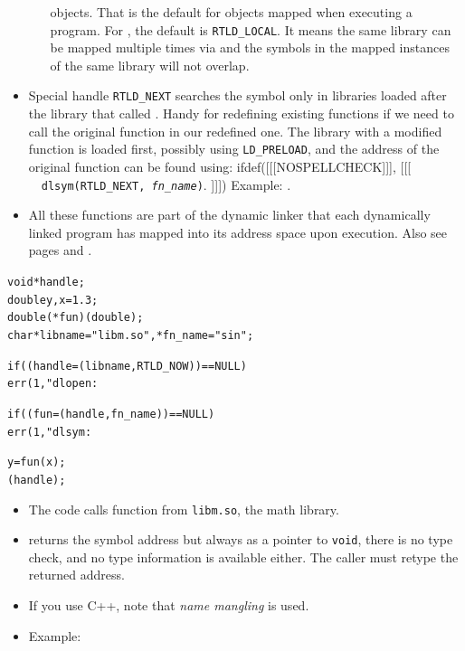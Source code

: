 \begin{itemize}
\begin{itemize}
    objects.  That is the default for objects mapped when executing a program.
    For , the default is \texttt{RTLD\_LOCAL}.  It means
    the same library can be mapped multiple times via  and the
    symbols in the mapped instances of the same library will not overlap.
    \end{itemize}
\item \label{RTLD_NEXT} Special handle \texttt{RTLD\_NEXT} searches the symbol
only in libraries loaded after the library that called .  Handy for
redefining existing functions if we need to call the original function in our
redefined one.  The library with a modified function is loaded first, possibly
using \texttt{LD\_PRELOAD}, and the address of the original function can be
found using:
ifdef([[[NOSPELLCHECK]]], [[[
~~\texttt{dlsym(RTLD\_NEXT, \emph{fn\_name})}.
]]])
Example: .
\item  All these functions are part of the dynamic linker that each dynamically
linked program has mapped into its address space upon execution.  Also see pages
\pageref{RUNTIMELINKER} and \pageref{EXEC}.
\end{itemize}


\begin{slide}
\begin{alltt}
void *handle;
double y, x = 1.3;
double (*fun)(double); 
char *libname = "libm.so", *fn\_name = "sin";

if ((handle = (libname, RTLD\_NOW)) == NULL)
        err(1, "dlopen: %

if ((fun = (handle, fn\_name)) == NULL)
        err(1, "dlsym: %

y = fun(x);
(handle);
\end{alltt}
\end{slide}

\begin{itemize}
\item The code calls function  from \texttt{libm.so}, the math
library.
\item {} returns the symbol address but always as a pointer to
\texttt{void}, there is no type check, and no type information is available
either.  The caller must retype the returned address.
\item If you use C++, note that \emph{name mangling} is used.
\item Example: 
\end{itemize}

\endinput
